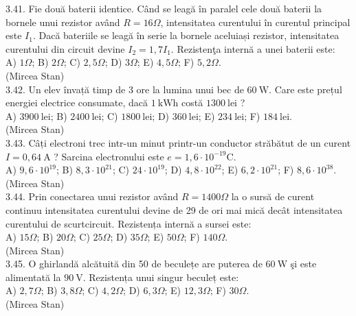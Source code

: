 3.41. Fie două baterii identice. Când se leagă în paralel cele două baterii la bornele unui rezistor având $R=16 \Omega$, intensitatea curentului în curentul principal este $I_{1}$. Dacă bateriile se leagă în serie la bornele aceluiași rezistor, intensitatea curentului din circuit devine $I_{2}=1,7 I_{1}$. Rezistenţa internă a unei baterii este:\\ A) $1 \Omega$; B) $2 \Omega$; C) $2,5 \Omega$; D) $3 \Omega$; E) $4,5 \Omega$; F) $5,2 \Omega$.\\ (Mircea Stan)\\

3.42. Un elev învață timp de 3 ore la lumina unui bec de $60 \mathrm{~W}$. Care este prețul energiei electrice consumate, dacă $1 \mathrm{~kWh}$ costă $1300 \mathrm{~lei}$ ?\\ A) $3900 \mathrm{~lei}$; B) $2400 \mathrm{~lei}$; C) $1800 \mathrm{~lei}$; D) $360 \mathrm{~lei}$; E) $234 \mathrm{~lei}$; F) $184 \mathrm{~lei}$.\\ (Mircea Stan)\\

3.43. Câți electroni trec intr-un minut printr-un conductor străbătut de un curent $I=0,64 \mathrm{~A}$ ? Sarcina electronului este $e=1,6 \cdot 10^{-19} \mathrm{C}$.\\ A) $9,6 \cdot 10^{19}$; B) $8,3 \cdot 10^{21}$; C) $24 \cdot 10^{19}$; D) $4,8 \cdot 10^{22}$; E) $6,2 \cdot 10^{21}$; F) $8,6 \cdot 10^{38}$.\\ (Mircea Stan)\\

3.44. Prin conectarea unui rezistor având $R=1400 \Omega$ la o sursă de curent continuu intensitatea curentului devine de 29 de ori mai mică decât intensitatea curentului de scurtcircuit. Rezistența internă a sursei este:\\ A) $15 \Omega$; B) $20 \Omega$; C) $25 \Omega$; D) $35 \Omega$; E) $50 \Omega$; F) $140 \Omega$.\\ (Mircea Stan)\\

3.45. O ghirlandă alcătuită din 50 de beculețe are puterea de $60 \mathrm{~W}$ şi este alimentată la $90 \mathrm{~V}$. Rezistența unui singur beculeț este:\\ A) $2,7 \Omega$; B) $3,8 \Omega$; C) $4,2 \Omega$; D) $6,3 \Omega$; E) $12,3 \Omega$; F) $30 \Omega$.\\ (Mircea Stan)\\


